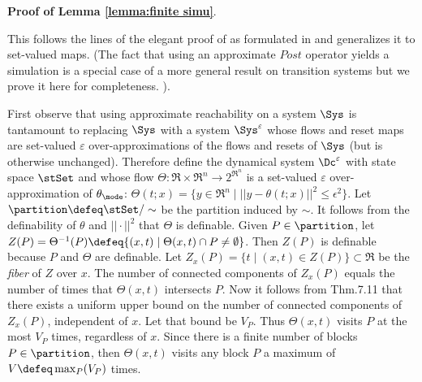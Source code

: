 {\large \textbf{Proof of Lemma \ref{lemma:finite simu}}.}
\begin{prf}
	This follows the lines of the elegant proof of \cite{BrihayeM05_ominimal} as formulated in \cite{tabuada} and generalizes it to set-valued maps.
	(The fact that using an approximate $Post$ operator yields a simulation is a special case of a more general result on transition systems but we prove it here for completeness. 
	).
	
	First observe that using approximate reachability on a system $\Sys$ is tantamount to replacing $\Sys$ with a system $\Sys^\varepsilon$ whose flows and reset maps are set-valued $\varepsilon$ over-approximations of the flows and resets of $\Sys$ (but is otherwise unchanged).
	Therefore define the dynamical system $\Dc^\varepsilon$ with state space $\stSet$ and whose flow $\Theta: \Re \times \Re^n \rightarrow 2^{\Re^n}$ is a set-valued $\varepsilon$ over-approximation of $\theta_\mode$:
	$\Theta(t;x) = \{y \in \Re^n \;|\; ||y-\theta(t;x)||^2 \leq \epsilon^2\}$.	
	Let $\partition \defeq \stSet/\sim$ be the partition induced by $\sim$.
	It follows from the definability of $\theta$ and $||\cdot||^2$ that $\Theta$ is definable. 
	Given $P \in \partition$, let $Z(P) = \Theta^{-1}(P) \defeq \{(x,t) \;|\; \Theta(x,t) \cap P \neq \emptyset\}$.
	Then $Z(P)$ is definable because $P$ and $\Theta$ are definable.
	Let $Z_x(P) = \{t \;|\; (x,t) \in Z(P)\} \subset \Re$ be the \emph{fiber} of $Z$ over $x$.
	The number of connected components of $Z_x(P)$ equals the number of times that $\Theta(x,t)$ intersects $P$.
	Now it follows from \cite{tabuada} Thm.7.11 that there exists a uniform upper bound on the number of connected components of $Z_x(P)$, independent of $x$.
	Let that bound be $V_P$.
	Thus $\Theta(x,t)$ visits $P$ at the most $V_P$ times, regardless of $x$.
	Since there is a finite number of blocks $P \in \partition$, then $\Theta(x,t)$ visits any block $P$ a maximum of $V \defeq \max_P(V_P)$ times.%
	

\end{prf}
